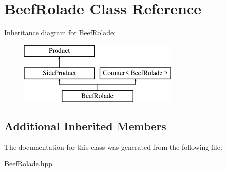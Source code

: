 \hypertarget{class_beef_rolade}{}\section{Beef\+Rolade Class Reference}
\label{class_beef_rolade}
Inheritance diagram for Beef\+Rolade\+:\begin{figure}[H]
\begin{center}
\leavevmode
\includegraphics[height=3.000000cm]{class_beef_rolade}
\end{center}
\end{figure}
\subsection*{Additional Inherited Members}


The documentation for this class was generated from the following file\+:\begin{DoxyCompactItemize}
\item 
Beef\+Rolade.\+hpp\end{DoxyCompactItemize}

